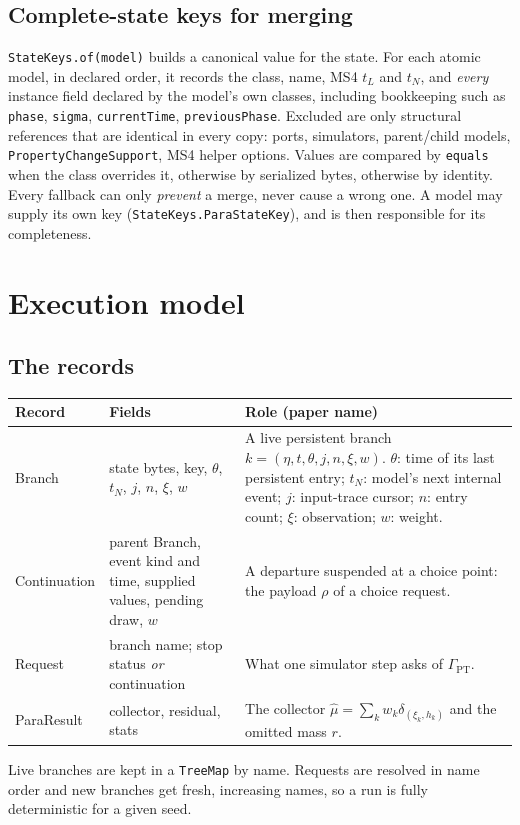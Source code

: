 \documentclass[11pt]{article}
\newcommand{\code}[1]{\texttt{#1}}
\begin{document}
\subsection{Complete-state keys for merging}
\code{StateKeys.of(model)} builds a canonical value for the state. For each atomic model, in declared order, it
records the class, name, MS4 $t_L$ and $t_N$, and \emph{every} instance field declared by the model's own classes,
including bookkeeping such as \code{phase}, \code{sigma}, \code{currentTime}, \code{previousPhase}. Excluded are only
structural references that are identical in every copy: ports, simulators, parent/child models,
\code{PropertyChangeSupport}, MS4 helper options. Values are compared by \code{equals} when the class overrides it,
otherwise by serialized bytes, otherwise by identity. Every fallback can only \emph{prevent} a merge, never cause a wrong
one. A model may supply its own key (\code{StateKeys.ParaStateKey}), and is then responsible for its completeness.

\section{Execution model}

\subsection{The records}
\begin{center}
\small
\begin{tabularx}{\linewidth}{@{}>{\ttfamily}p{2.8cm} p{4.4cm} Y@{}}
\toprule
\normalfont\textbf{Record} & \textbf{Fields} & \textbf{Role (paper name)}\\
\midrule
Branch & state bytes, key, $\theta$, $t_N$, $j$, $n$, $\xi$, $w$ &
  A live persistent branch $k=(\eta,t,\theta,j,n,\xi,w)$. $\theta$: time of its last persistent entry; $t_N$: model's
  next internal event; $j$: input-trace cursor; $n$: entry count; $\xi$: observation; $w$: weight.\\
Continuation & parent Branch, event kind and time, supplied values, pending draw, $w$ &
  A departure suspended at a choice point: the payload $\rho$ of a choice request.\\
Request & branch name; stop status \emph{or} continuation & What one simulator step asks of $\Gamma_{\mathrm{PT}}$.\\
ParaResult & collector, residual, stats & The collector $\widehat\mu=\sum_k w_k\delta_{(\xi_k,h_k)}$ and the omitted mass $r$.\\
\bottomrule
\end{tabularx}
\end{center}
Live branches are kept in a \code{TreeMap} by name. Requests are resolved in name order and new branches get fresh,
increasing names, so a run is fully deterministic for a given seed.
\end{document}
